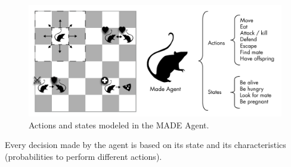 \documentclass[letterpaper]{article}
\begin{document}
\begin{figure}
\begin{center}
\includegraphics[scale=0.35]{img/MadeAgent.pdf}
\caption{Actions and states modeled in the MADE Agent.}
\label{fig:madeAgent}
\end{center}
\end{figure}




Every
decision made by the agent is based on its state and its
characteristics (probabilities to perform different actions). %





\end{document}
